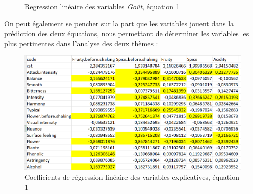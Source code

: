 \documentclass[a4paper,french,10pt]{article}
\begin{document}
\begin{figure}[htp]
{	}%
	\hfill%
	\caption{Regression linéaire des variables \textit{Goût}, équation 1}
\end{figure}

On peut également se pencher sur la part que les variables jouent dans la prédiction des deux équations, nous permettant de déterminer les variables les plus pertinentes dans l'analyse des deux thèmes : 

\begin{figure}[htp] 
	\centering
	\includegraphics[scale=0.45]{images/Coeff_var_Eq1.png}
	\caption{Coefficients de régression linéaire des variables explicatives, équation 1}
\end{figure}
\end{document}
